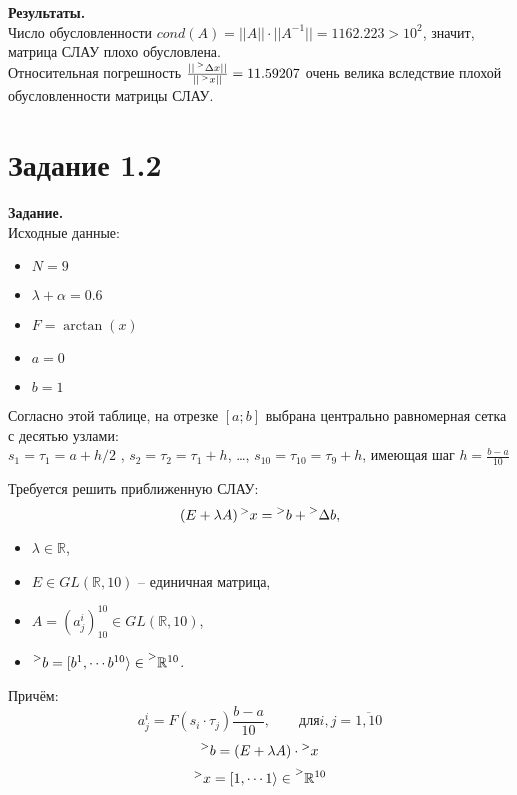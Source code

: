 \documentclass[14pt,a4paper]{scrartcl}
\begin{document}
\textbf{Результаты.}\\
Число обусловленности $cond(A) = ||A|| \cdot ||A^{-1}|| = 1162.223 > 10^2$, значит, матрица СЛАУ плохо обусловлена.\\
Относительная погрешность $	\frac{||\prescript{>}{}{\Delta x}||}{||\prescript{>}{}{x}||} = 11.59207$ очень велика вследствие плохой обусловленности матрицы СЛАУ.

\section*{Задание 1.2}
\textbf{Задание.}\\
Исходные данные:
\begin{itemize}
	\item $N = 9$
	\item $\lambda + \alpha = 0.6$
	\item $F = \arctan(x)$
	\item $a = 0$
	\item $b = 1$
\end{itemize}

Согласно этой таблице, на отрезке $[a;b]$ выбрана центрально равномерная сетка с десятью узлами:\\
$s_1 = \tau_1 = a + h/2$ , $s_2 = \tau_2 = \tau_1 + h$, \dots, $s_10 = \tau_10 = \tau_9 + h$, имеющая шаг $h = \frac{b - a}{10}$

Требуется решить приближенную СЛАУ:
\begin{equation*}
	(E + \lambda A) \prescript{>}{}{x} = \prescript{>}{}{b} + \prescript{>}{}{\Delta b},
\end{equation*}
\begin{itemize}
	\item[] $ \lambda \in \mathbb{R}$,
	\item[] $ E \in GL(\mathbb{R}, 10)$ -- единичная матрица,
	\item[] $ A = (a_j^i)_{10}^{10} \in GL(\mathbb{R}, 10)$,
	\item[] $ \prescript{>}{}{b} = [b^1, \cdots b^{10}\rangle  \in \prescript{>}{}{\mathbb{R}^{10}}$.
\end{itemize}

Причём:
\begin{equation*}
	a_j^i = F(s_i \cdot \tau_j) \frac{b-a}{10}, \qquad \text{для} i,j = \overline{1,10}
\end{equation*}
\begin{equation*}
	\prescript{>}{}{b} = (E + \lambda A)\cdot \prescript{>}{}{x}
\end{equation*}
\begin{equation*}
	\prescript{>}{}{x} = [1, \cdots 1\rangle \in \prescript{>}{}{\mathbb{R}^{10}}
\end{equation*}
\end{document}
